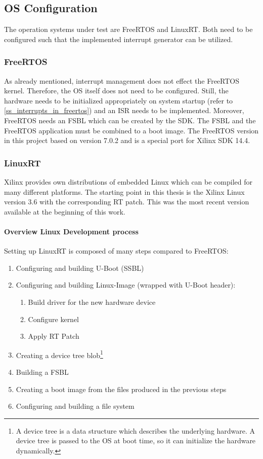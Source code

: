\subsection{\ac{OS} Configuration}
The operation systems under test are FreeRTOS and LinuxRT.
Both need to be configured such that the implemented interrupt generator can be utilized.

\subsubsection{FreeRTOS}
As already mentioned, interrupt management does not effect the FreeRTOS kernel.
Therefore, the \ac{OS} itself does not need to be configured.
Still, the hardware needs to be initialized appropriately on system startup (refer to \ref{ss_interrupts_in_freertos}) and an \ac{ISR} needs to be implemented. 
Moreover, FreeRTOS needs an \ac{FSBL} which can be created by the \ac{SDK}.
The \ac{FSBL} and the FreeRTOS application must be combined to a boot image.
The FreeRTOS version in this project based on version 7.0.2 and is a special port for Xilinx \ac{SDK} 14.4.


\subsubsection{LinuxRT}\label{sss_linuxrt}
Xilinx provides own distributions of embedded Linux which can be compiled for many different platforms. 
The starting point in this thesis is the Xilinx Linux version 3.6 with the corresponding RT patch.
This was the most recent version available at the beginning of this work.

\paragraph{Overview Linux Development process}
Setting up LinuxRT is composed of many steps compared to FreeRTOS:
\begin{enumerate}
	\item Configuring and building U-Boot (\ac{SSBL})
	\item Configuring and building Linux-Image (wrapped with U-Boot header):
		\begin{enumerate}
			\item Build driver for the new hardware device
			\item Configure kernel
			\item Apply RT Patch
		\end{enumerate}
	\item Creating a device tree blob\footnote{A device tree is a data structure which describes the underlying hardware. A device tree is passed to the \ac{OS} at boot time, so it can initialize the hardware dynamically.\cite{device_tree}}
	\item Building a \ac{FSBL}
	\item Creating a boot image from the files produced in the previous steps
	\item Configuring and building a file system
\end{enumerate}

